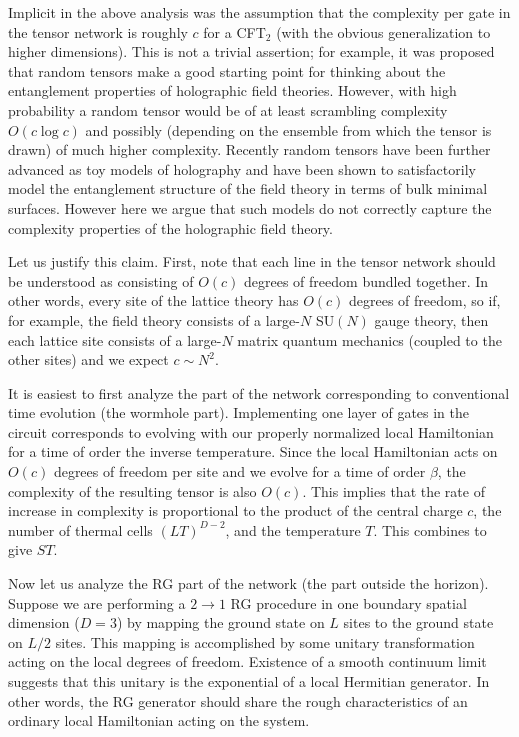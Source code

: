 \documentclass[12pt]{article}
\numberwithin{equation}{section}
\begin{document}
Implicit in the above analysis was the assumption that the complexity per gate in the tensor network is roughly $c$ for a CFT$_2$ (with the obvious generalization to higher dimensions). This is not a trivial assertion; for example, it was proposed \cite{Swingle:2012wq} that random tensors make a good starting point for thinking about the entanglement properties of holographic field theories. However, with high probability a random tensor would be of at least scrambling complexity $O(c \log c)$ and possibly (depending on the ensemble from which the tensor is drawn) of much higher complexity. Recently random tensors have been further advanced \cite{Yang:2015uoa,RandomModelHolgraphy,Hosur:2015ylk} as toy models of holography and have been shown to satisfactorily model the entanglement structure of the field theory in terms of bulk minimal surfaces. However here we argue that such models do not correctly capture the complexity properties of the holographic field theory.

Let us justify this claim. First, note that each line in the tensor network should be understood as consisting of $O(c)$ degrees of freedom bundled together. In other words, every site of the lattice theory has $O(c)$ degrees of freedom, so if, for example, the field theory consists of a large-$N$ SU$(N)$ gauge theory, then each lattice site consists of a large-$N$ matrix quantum mechanics (coupled to the other sites) and we expect $c \sim N^2$.

It is easiest to first analyze the part of the network corresponding to conventional time evolution (the wormhole part). Implementing one layer of gates in the circuit corresponds to evolving with our properly normalized local Hamiltonian for a time of order the inverse temperature. Since the local Hamiltonian acts on $O(c)$ degrees of freedom per site and we evolve for a time of order $\beta$, the complexity of the resulting tensor is also $O(c)$. This implies that the rate of increase in complexity is proportional to the product of the central charge $c$, the number of thermal cells $(L T)^{D-2}$, and the temperature $T$. This combines to give $ST$.

Now let us analyze the RG part of the network (the part outside the horizon). Suppose we are performing a $2\rightarrow 1$ RG procedure in one boundary spatial dimension ($D=3$) by mapping the ground state on $L$ sites to the ground state on $L/2$ sites. This mapping is accomplished by some unitary transformation acting on the local degrees of freedom. Existence of a smooth continuum limit suggests that this unitary is the exponential of a local Hermitian generator. In other words, the RG generator should share the rough characteristics of an ordinary local Hamiltonian acting on the system.%
\end{document}
